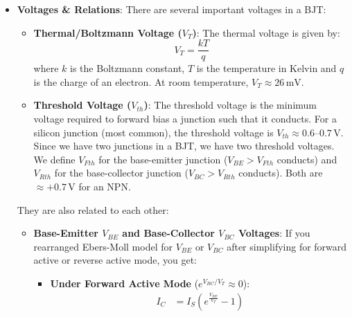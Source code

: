 \begin{itemize}
\begin{itemize}
\begin{align*}
          g_{be} = \frac{38.5\,\text{mS}}{100} = 385\,\mu\text{S} \ (r_{be} = 2.6\,\text{k}\Omega) \hspace{1cm}
          g_o = \frac{1\,\text{mA}}{100\,\text{V}} = 10\,\mu\text{S}
        \end{align*}
        The model is valid while \(|V_{be}| \ll 2V_T \approx 52\,\text{mV}\)
        (the bound of Section~\ref{sec:analysis_linearization} with \(n = 1\)).
        At high frequency add \(C_{be}\) (diffusion plus junction) between
        base and emitter and \(C_{bc}\) (junction) between base and collector.
    \end{itemize}
  \item \textbf{Voltages \& Relations}:
    There are several important voltages in a BJT:
    \begin{itemize}
      \item \textbf{Thermal/Boltzmann Voltage (\(V_T\))}:
        The thermal voltage is given by:
        \[
          V_T = \frac{kT}{q}
        \]
        where \(k\) is the Boltzmann constant, \(T\) is the temperature in
        Kelvin and \(q\) is the charge of an electron. At room temperature,
        \(V_T \approx 26\,\mathrm{mV}\).
      \item \textbf{Threshold Voltage (\(V_{th}\))}:
        The threshold voltage is the minimum voltage required to forward
        bias a junction such that it conducts. For a silicon junction (most
        common), the threshold voltage is \(V_{th} \approx 0.6\text{--}0.7\,\mathrm{V}\).
        Since we have two junctions in a BJT, we have two threshold voltages.
        We define \(V_{Fth}\) for the base-emitter junction (\(V_{BE} > V_{Fth}\)
        conducts) and \(V_{Rth}\) for the base-collector junction
        (\(V_{BC} > V_{Rth}\) conducts). Both are \(\approx +0.7\,\)V for an NPN.
    \end{itemize}
    They are also related to each other:
    \begin{itemize}
      \item \textbf{Base-Emitter \(V_{BE}\) and Base-Collector \(V_{BC}\) Voltages}:
        If you rearranged Ebers-Moll model for \(V_{BE}\) or \(V_{BC}\) after
        simplifying for forward active or reverse active mode, you get:
        \begin{itemize}
          \item \textbf{Under Forward Active Mode} (\(e^{V_{BC}/V_T} \approx 0\)):
            \begin{align*}
              I_C &= I_S \left( e^{\frac{V_{BE}}{V_T}} - 1 \right) \\

\end{align*}
\end{itemize}
\end{itemize}
\end{itemize}
